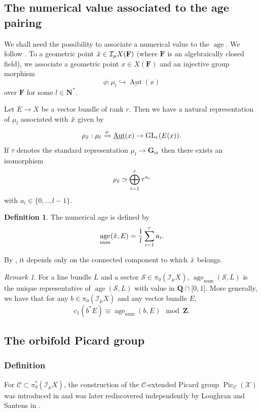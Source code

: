\documentclass{proc-l}
\newcommand{\Z}{\mathbf{Z}}
\newcommand{\N}{\mathbf{N}}
\newcommand{\Q}{\mathbf{Q}}
\newcommand{\F}{\mathbf{F}}
\newcommand{\G}{\mathbf{G}}
\DeclareMathOperator{\Pic}{Pic}
\DeclareMathOperator{\Aut}{Aut}
\DeclareMathOperator{\num}{num}
\DeclareMathOperator{\age}{age}
\newcommand{\stackX}{\mathcal{X}}
\newcommand{\stackS}{\mathcal{S}}
\newcommand{\sheafI}{\mathcal{I}}
\newcommand{\sector}{\pi_0(\sheafI_{\mu} X)}
\newcommand{\twistsector}{\pi_0^*(\sheafI_{\mu} X)}
\theoremstyle{definition}
\newtheorem{definition}[theorem]{Definition}
\theoremstyle{remark}
\newtheorem{remark}[theorem]{Remark}
\numberwithin{equation}{section}
\begin{document}
\subsection{The numerical value associated to the age pairing}

We shall need the possibility to associate a numerical value to the $\age$. We follow \cite[paragraph 2.3]{darda2024batyrevmanin}. To a geometric point $\Tilde{x} \in \sheafI_{\mu} X(\F)$ (where $\F$ is an algebraically closed field), we associate a geometric point $x \in X(\F)$ and an injective group morphism $$\phi : \mu_{l} \hookrightarrow \underline{\Aut}(x)$$ over $\F$ for some $l \in \N^*$.

Let $E \rightarrow X$ be a vector bundle of rank $r$. Then we have a natural representation of $\mu_l$ associated with $\Tilde{x}$ given by $$\rho_{\Tilde{x}} : \mu_l \xrightarrow{\phi} \underline{\Aut}(x) \rightarrow \text{GL}_r( E(x)) .$$ If $\tau$ denotes the standard representation $\mu_l \rightarrow \G_m$ then there exists an isomorphism $$\rho_{\Tilde{x}} \simeq \bigoplus\limits_{i = 1}^r \tau^{a_i}$$ with $a_i \in \{ 0,..,l-1 \}$.

\begin{definition}
    The numerical age is defined by
    $$\age_{\num}(\Tilde{x},E) = \frac{1}{l} \sum\limits_{i = 1}^r a_i .$$
\end{definition}

By \cite[lemma 2.22]{darda2024batyrevmanin}, it depends only on the connected component to which $\Tilde{x}$ belongs.

\begin{remark}
    For a line bundle $L$ and a sector $\stackS \in \sector$, $\age_{\num}(\stackS,L)$ is the unique representative of $\age(\stackS,L)$ with value in $\Q \cap [0,1[.$ More generally, we have that for any $b \in \sector$ and any vector bundle $E$, $$c_1(b^* E) \equiv \age_{\num}(b,E) \mod \Z .$$
\end{remark}

\subsection{The orbifold Picard group}

\subsubsection{Definition}

For $\mathcal{C} \subset \twistsector$, the construction of the $\mathcal{C}$-extended Picard group $\Pic_{\mathcal{C}}(\stackX)$ was introduced in \cite[Definition 17]{Coates_Corti_Iritani_Tseng_miror_theorem_toric_stack} and was later rediscovered independently by Loughran and Santens in \cite[Definition 3.8]{loughran_santens_malle_conjecture}. 
\end{document}
